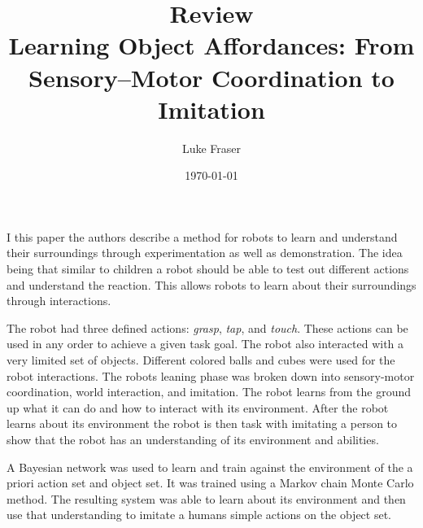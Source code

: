 \documentclass{article}
\begin{document}
\title{{\large Review} \\ Learning Object Affordances: From Sensory--Motor Coordination to Imitation}
\author{Luke Fraser}
\date{\today}
\maketitle

\begingroup
\renewcommand{\section}[2]{}


\endgroup

\section*{Summary}
I this paper the authors describe a method for robots to learn and understand their surroundings through experimentation as well as demonstration. The idea being that similar to children a robot should be able to test out different actions and understand the reaction. This allows robots to learn about their surroundings through interactions.

The robot had three defined actions: \emph{grasp}, \emph{tap}, and \emph{touch}. These actions can be used in any order to achieve a given task goal. The robot also interacted with a very limited set of objects. Different colored balls and cubes were used for the robot interactions. The robots leaning phase was broken down into sensory-motor coordination, world interaction, and imitation. The robot learns from the ground up what it can do and how to interact with its environment. After the robot learns about its environment the robot is then task with imitating a person to show that the robot has an understanding of its environment and abilities.

A Bayesian network was used to learn and train against the environment of the a priori action set and object set. It was trained using a Markov chain Monte Carlo method. The resulting system was able to learn about its environment and then use that understanding to imitate a humans simple actions on the object set.
\end{document}
